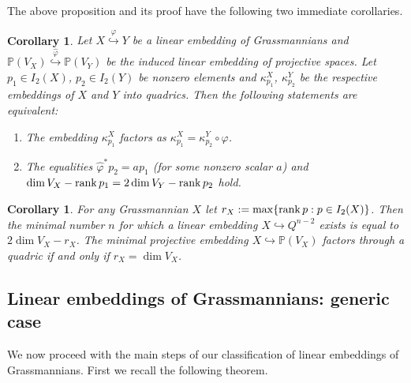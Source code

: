 \documentclass[12pt]{amsart}
\def\PP {{\mathbb P}}     %
\newtheorem{coro}[theorem]{Corollary}
\begin{document}
The above proposition and its proof have the following two immediate corollaries.

\begin{coro}
Let $X\stackrel{\varphi}{\hookrightarrow} Y$ be a linear embedding of Grassmannians and $\PP(V_X)\stackrel{\hat\varphi}{\hookrightarrow} \PP(V_Y)$ be the induced linear embedding of projective spaces. Let $p_1\in I_2(X)$, $p_2\in I_2(Y)$ be nonzero elements and $\kappa^X_{p_1}$, $\kappa^Y_{p_2}$ be the respective embeddings of $X$ and $Y$ into quadrics. Then the following statements are equivalent:
\begin{enumerate}
\item[{\rm (i)}] The embedding $\kappa^X_{p_1}$ factors as $\kappa^X_{p_1}=\kappa^Y_{p_2}\circ\varphi$.
\item[{\rm (ii)}] The equalities $\hat\varphi^*p_2=ap_1$ (for some nonzero scalar $a$) and $\dim V_X-{\rm rank}\,p_1 = 2\dim V_Y - {\rm rank}\,p_2$ hold.
\end{enumerate}
\end{coro}

\begin{coro}
For any Grassmannian $X$ let $r_X:=\max\{{\rm rank}\,p:p\in I_2(X)\}$. Then the minimal number $n$ for which a linear embedding $X\hookrightarrow Q^{n-2}$ exists is equal to $2\dim V_X- r_X$. The minimal projective embedding $X\hookrightarrow \PP(V_X)$ factors through a quadric if and only if $r_X=\dim V_X$.
\end{coro}


\subsection{Linear embeddings of Grassmannians: generic case}

We now proceed with the main steps of our classification of linear embeddings of Grassmannians. First we recall the following theorem.
\end{document}
